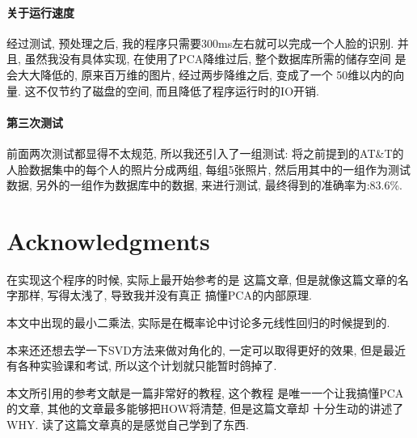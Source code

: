 \documentclass[fleqn,10pt]{SelfArx} %
\begin{document}
	\paragraph{关于运行速度}
		经过测试, 预处理之后, 我的程序只需要300ms左右就可以完成一个人脸的识别.
		并且, 虽然我没有具体实现, 在使用了PCA降维过后, 整个数据库所需的储存空间
		是会大大降低的, 原来百万维的图片, 经过两步降维之后, 变成了一个
		50维以内的向量. 这不仅节约了磁盘的空间, 而且降低了程序运行时的IO开销.

	\paragraph{第三次测试}
		前面两次测试都显得不太规范, 所以我还引入了一组测试:
		将之前提到的AT\&T的人脸数据集中的每个人的照片分成两组, 每组5张照片,
		然后用其中的一组作为测试数据, 另外的一组作为数据库中的数据, 来进行测试,
		最终得到的准确率为:83.6\%. 

\section*{Acknowledgments} %
在实现这个程序的时候, 实际上最开始参考的是\cite{tutorial:PCA}
这篇文章, 但是就像这篇文章的名字那样, 写得太浅了, 导致我并没有真正
搞懂PCA的内部原理.

本文中出现的最小二乘法, 实际是在概率论\cite{prob}中讨论多元线性回归的时候提到的.

本来还还想去学一下SVD方法来做对角化的, 一定可以取得更好的效果, 
但是最近有各种实验课和考试, 所以这个计划就只能暂时鸽掉了.

本文所引用的参考文献\cite{princetonPCA:25:2003}是一篇非常好的教程, 这个教程
是唯一一个让我搞懂PCA的文章, 其他的文章最多能够把HOW将清楚, 但是这篇文章却
十分生动的讲述了WHY. 读了这篇文章真的是感觉自己学到了东西.





\end{document}

